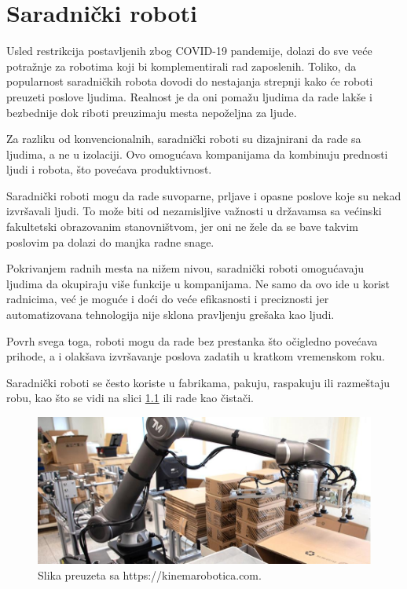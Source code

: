 \documentclass{report}
\begin{document}
	
	\chapter{Saradnički roboti}
	
	Usled restrikcija postavljenih zbog COVID-19 pandemije, dolazi do sve veće potražnje za robotima koji bi komplementirali rad zaposlenih. Toliko, da popularnost saradničkih robota dovodi do nestajanja strepnji kako će roboti preuzeti poslove ljudima. Realnost je da oni pomažu ljudima da rade lakše i bezbednije dok riboti preuzimaju mesta nepoželjna za ljude.
	
	Za razliku od konvencionalnih, saradnički roboti su dizajnirani da rade sa ljudima, a ne u izolaciji. Ovo omogućava kompanijama da kombinuju prednosti ljudi i robota, što povećava produktivnost. \cite{robotics2022}
	
	Saradnički roboti mogu da rade suvoparne, prljave i opasne poslove koje su nekad izvršavali ljudi. To može biti od nezamisljive važnosti u državamsa sa većinski fakultetski obrazovanim stanovništvom, jer oni ne žele da se bave takvim poslovim pa dolazi do manjka radne snage.
	
	Pokrivanjem radnih mesta na nižem nivou, saradnički roboti omogućavaju ljudima da okupiraju više funkcije u kompanijama. Ne samo da ovo ide u korist radnicima, već je moguće i doći do veće efikasnosti i preciznosti jer automatizovana tehnologija nije sklona pravljenju grešaka kao ljudi.
	
	Povrh svega toga, roboti mogu da rade bez prestanka što očigledno povećava prihode, a i olakšava izvršavanje poslova zadatih u kratkom vremenskom roku. \cite{cobots}
	
	Saradnički roboti se često koriste u fabrikama, pakuju, raspakuju ili razmeštaju robu, kao što se vidi na slici \ref{cobot} ili rade kao čistači.
	
	\begin{figure}
		\centering
		\includegraphics[scale=0.41]{Cobot.jpg}
		\caption{Slika preuzeta sa https://kinemarobotica.com.}
		\label{cobot}
	\end{figure}
	
\end{document}
